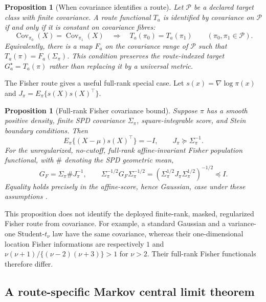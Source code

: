 \documentclass[11pt]{article}
\theoremstyle{plain}
\newtheorem{proposition}[theorem]{Proposition}
\theoremstyle{definition}
\theoremstyle{remark}
\begin{document}
\begin{proposition}[When covariance identifies a route]\label{prop:fibre}
Let $\mathcal P$ be a declared target class with finite covariance. A route
functional $T_a$ is identified by covariance on $\mathcal P$ if and only if it
is constant on covariance fibres:
\[
 \operatorname{Cov}_{\pi_0}(X)=\operatorname{Cov}_{\pi_1}(X)
 \quad\Longrightarrow\quad T_a(\pi_0)=T_a(\pi_1)
 \qquad(\pi_0,\pi_1\in\mathcal P).
\]
Equivalently, there is a map $F_a$ on the covariance range of $\mathcal P$ such
that $T_a(\pi)=F_a(\Sigma_\pi)$. This condition preserves the route-indexed
target $G_a^\star=T_a(\pi)$ rather than replacing it by a universal metric.
\end{proposition}

The Fisher route gives a useful full-rank special case. Let
$s(x)=\nabla\log\pi(x)$ and
$J_\pi=E_\pi\{s(X)s(X)^\top\}$.

\begin{proposition}[Full-rank Fisher covariance bound]\label{prop:fisher}
Suppose $\pi$ has a smooth positive density, finite SPD covariance
$\Sigma_\pi$, square-integrable score, and Stein boundary conditions. Then
\[
 E_\pi\{(X-\mu)s(X)^\top\}=-I,\qquad
 J_\pi\succeq\Sigma_\pi^{-1}.
\]
For the unregularized, no-cutoff, full-rank affine-invariant Fisher population
functional, with $\#$ denoting the SPD geometric mean,
\[
 G_F=\Sigma_\pi\#J_\pi^{-1},\qquad
 \Sigma_\pi^{-1/2}G_F\Sigma_\pi^{-1/2}
 =(\Sigma_\pi^{1/2}J_\pi\Sigma_\pi^{1/2})^{-1/2}\preceq I.
\]
Equality holds precisely in the affine-score, hence Gaussian, case under these
assumptions \citep{dembo1991information}.
\end{proposition}

This proposition does not identify the deployed finite-rank, masked,
regularized Fisher route from covariance. For example, a standard Gaussian and
a variance-one Student-$t_\nu$ law have the same covariance, whereas their
one-dimensional location Fisher informations are respectively $1$ and
$\nu(\nu+1)/\{(\nu-2)(\nu+3)\}>1$ for $\nu>2$. Their full-rank Fisher
functionals therefore differ.

\subsection{A route-specific Markov central limit theorem}
\end{document}
